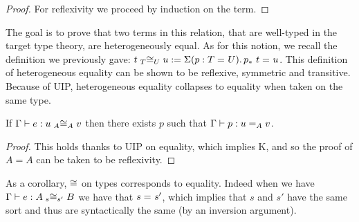 \begin{proof}
  For reflexivity we proceed by induction on the term.
\end{proof}


%

The goal is to prove that two terms in this relation, that are well-typed in the
target type theory, are heterogeneously equal. As for this notion, we recall
the definition we previously gave:
$\Heq{T}{t}{U}{u} := \Sum{p:\Eq{}{T}{U}} \Eq{}{\transpo{p}\ t}{u}$.
%
This definition of heterogeneous equality can be shown to be
reflexive, symmetric and transitive. Because of UIP, heterogeneous
equality collapses to equality when taken on the same type.

\begin{lemma}
  \label{lem:uip-cong}
  If $\isterm{\Ga}{e}{\Heq{A}{u}{A}{v}}$
  then there exists $p$ such that $\isterm{\Ga}{p}{\Eq{A}{u}{v}}$.
\end{lemma}

\begin{proof}
  This holds thanks to UIP on equality, which implies K, and so the
  proof of $A = A$ can be taken to be reflexivity.
\end{proof}

\begin{note}
  As a corollary, $\Heqs$ on types corresponds to equality.
  Indeed when we have $\isterm{\Ga}{e}{\Heq{s}{A}{s'}{B}}$ we have
  that $\Eq{}{s}{s'}$, which implies that $s$ and $s'$ have the same sort
  and thus are syntactically the same (by an inversion argument).
\end{note}

